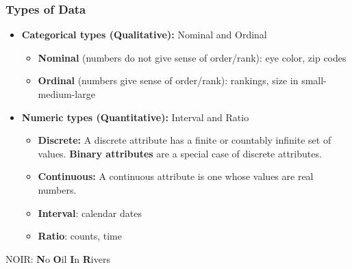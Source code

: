 \begin{frame}[fragile]\frametitle{Types of Data}	

	\begin{itemize}
	\item {\bf Categorical types (Qualitative):} Nominal and Ordinal
		\begin{itemize}
	\item {\bf Nominal} (numbers do not give sense of order/rank): eye color, zip codes
	\item {\bf Ordinal} (numbers give sense of order/rank): rankings, size in {small- medium-large}
		\end{itemize}
	\item {\bf Numeric types (Quantitative):} Interval and Ratio
			\begin{itemize}

		\item {\bf Discrete:} A discrete attribute has a finite or countably infinite
		set of values. {\bf Binary attributes} are a special case of discrete attributes. 
		\item {\bf Continuous:} A continuous attribute is one whose values are real numbers.
	
	\item {\bf Interval}: calendar dates
	\item {\bf Ratio}: counts, time
			\end{itemize}
	\end{itemize}
NOIR: {\bf N}o {\bf O}il {\bf I}n {\bf R}ivers
\end{frame}




